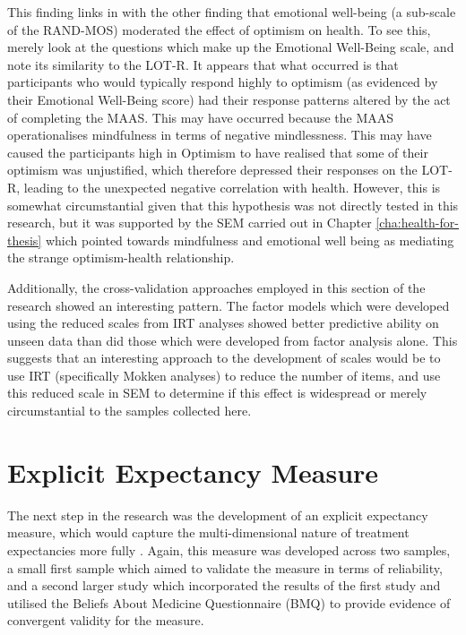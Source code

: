 This finding links in with the other finding that emotional well-being
(a sub-scale of the RAND-MOS) moderated the effect of optimism on
health. To see this, merely look at the questions which make up the
Emotional Well-Being scale, and note its similarity to the LOT-R. It
appears that what occurred is that participants who would typically
respond highly to optimism (as evidenced by their Emotional Well-Being
score) had their response patterns altered by the act of completing
the MAAS. This may have occurred because the MAAS operationalises
mindfulness in terms of negative mindlessness. This may have caused
the participants high in Optimism to have realised that some of their
optimism was unjustified, which therefore depressed their responses on
the LOT-R, leading to the unexpected negative correlation with health.
However, this is somewhat circumstantial given that this hypothesis
was not directly tested in this research, but it was supported by the
SEM carried out in Chapter \ref{cha:health-for-thesis} which pointed
towards mindfulness and emotional well being as mediating the strange
optimism-health relationship.

Additionally, the cross-validation approaches employed in this section
of the research showed an interesting pattern. The factor models which
were developed using the reduced scales from IRT analyses showed
better predictive ability on unseen data than did those which were
developed from factor analysis alone. This suggests that an
interesting approach to the development of scales would be to use IRT
(specifically Mokken analyses) to reduce the number of items, and use
this reduced scale in SEM to determine if this effect is widespread or
merely circumstantial to the samples collected here.

\section{Explicit Expectancy Measure}
\label{sec:expl-expect-meas}

The next step in the research was the development of an explicit
expectancy measure, which would capture the multi-dimensional nature
of treatment expectancies more fully \cite{Stone2005}. Again, this
measure was developed across two samples, a small first sample which
aimed to validate the measure in terms of reliability, and a second
larger study which incorporated the results of the first study and
utilised the Beliefs About Medicine Questionnaire (BMQ)
\cite{Horne1999} to provide evidence of convergent validity for the
measure.

